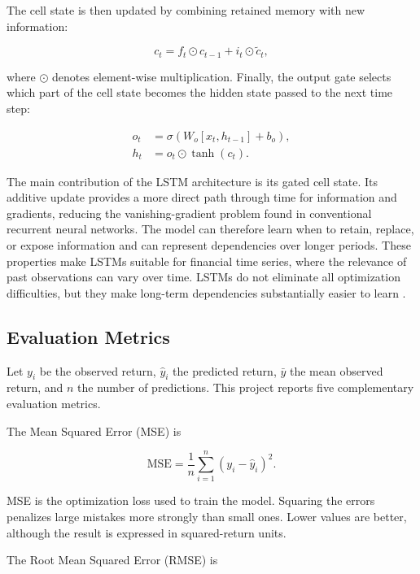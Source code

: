 \documentclass[12pt,a4paper]{article}
\begin{document}
The cell state is then updated by combining retained memory with new
information:

\begin{equation}
    c_t = f_t \odot c_{t-1} + i_t \odot \widetilde{c}_t,
\end{equation}

where $\odot$ denotes element-wise multiplication. Finally, the output gate
selects which part of the cell state becomes the hidden state passed to the
next time step:

\begin{align}
    o_t &= \sigma\left(W_o[x_t,h_{t-1}] + b_o\right), \\
    h_t &= o_t \odot \tanh(c_t).
\end{align}

The main contribution of the LSTM architecture is its gated cell state. Its
additive update provides a more direct path through time for information and
gradients, reducing the vanishing-gradient problem found in conventional
recurrent neural networks. The model can therefore learn when to retain,
replace, or expose information and can represent dependencies over longer
periods. These properties make LSTMs suitable for financial time series, where
the relevance of past observations can vary over time. LSTMs do not eliminate
all optimization difficulties, but they make long-term dependencies
substantially easier to learn \cite{vennerod2021}.

\subsection{Evaluation Metrics}

Let $y_i$ be the observed return, $\hat{y}_i$ the predicted return,
$\bar{y}$ the mean observed return, and $n$ the number of predictions. This
project reports five complementary evaluation metrics.

The Mean Squared Error (MSE) is

\begin{equation}
    \mathrm{MSE} = \frac{1}{n}\sum_{i=1}^{n}(y_i-\hat{y}_i)^2.
\end{equation}

MSE is the optimization loss used to train the model. Squaring the errors
penalizes large mistakes more strongly than small ones. Lower values are
better, although the result is expressed in squared-return units.

The Root Mean Squared Error (RMSE) is
\end{document}

